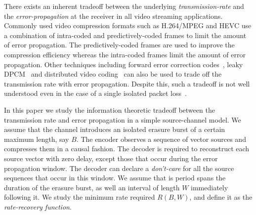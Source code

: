 \documentclass[journal, twocolumn, 10pt]{IEEEtran}
\begin{document}
There exists an inherent  tradeoff between the underlying {\em transmission-rate} and the {\em error-propagation} at the receiver in all video streaming applications.  Commonly used video compression formats such as H.264/MPEG and HEVC use a combination of intra-coded and predictively-coded frames to limit the amount of error propagation. The predictively-coded frames are used to improve the compression efficiency whereas the intra-coded frames limit the amount of error propagation. 
Other techniques  including forward error correction codes~\cite{tan}, leaky DPCM~\cite{Huang:08} and distributed video coding~\cite{pradhanRamchandran:03} can also be used to trade off the transmission rate with error propagation. Despite this, such a tradeoff is not well understood even in the case of a single isolated packet loss~\cite{Wang:06}.   



In this paper we study the information theoretic tradeoff between the transmission rate and error propagation in a simple source-channel model. 
We assume that the channel introduces an  isolated erasure burst of a certain maximum length, say $B$. The encoder observes a sequence of vector sources and compresses them in a causal fashion. The decoder is required to reconstruct each source vector with zero delay, except those that occur during the error propagation window. The decoder can declare a \emph{don't-care} for all the source sequences that occur in this window. We assume that is period spans the duration of the erasure burst, as well an interval of length $W$ immediately following it.  We study the minimum rate required $R(B,W)$, and define it as the \emph{rate-recovery function}.  

\end{document}
